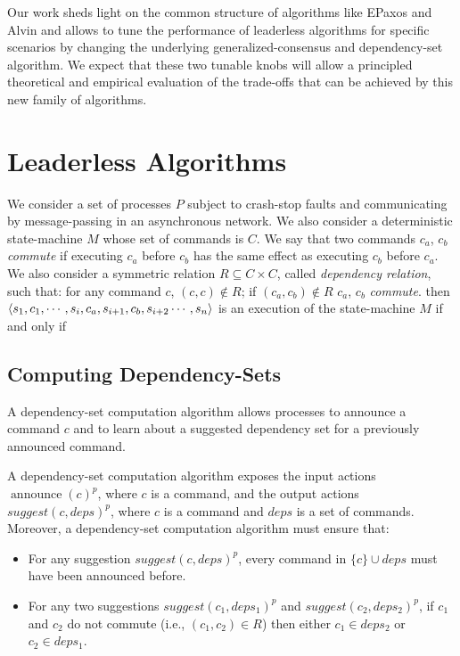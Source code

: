 Our work sheds light on the common structure of algorithms like EPaxos and Alvin and allows to tune the performance of leaderless algorithms for specific scenarios by changing the underlying generalized-consensus and dependency-set algorithm. 
We expect that these two tunable knobs will allow a principled theoretical and empirical evaluation of the trade-offs that can be achieved by this new family of algorithms.

\section{Leaderless Algorithms}

We consider a set of processes $P$ subject to crash-stop faults and communicating by message-passing in an asynchronous network.
We also consider a deterministic state-machine $M$ whose set of commands is $C$. We say that two commands $c_a$, $c_b$ \textit{commute} if executing $c_a$ before $c_b$ has the same effect as executing $c_b$ before $c_a$. We also consider a symmetric relation $R \subseteq C\times C$, called \textit{dependency relation}, such that: for any command $c$, $\left( c,c \right)\notin R$;  if $\left( c_a,c_b \right)\notin R$ $c_a$, $c_b$ \textit{commute}. then $\left\langle s_1,c_1,\cdots,s_i,c_a,s_{i+1},c_b,s_{i+2}\cdots,s_n\right\rangle$ is an execution of the state-machine $M$ if and only if

\subsection{Computing Dependency-Sets}

A dependency-set computation algorithm allows processes to announce a command $c$ and to learn about a suggested dependency set for a previously announced command.

A dependency-set computation algorithm exposes the input actions ${\operatorname{announce}\left( c \right)}^p$, where $c$ is a command, and the output actions ${suggest\left( c, deps \right)}^p$, where $c$ is a command and $deps$ is a set of commands.
Moreover, a dependency-set computation algorithm must ensure that:
\begin{itemize}[noitemsep,nolistsep]
    \item For any suggestion ${suggest\left( c, deps \right)}^p$, every command in $\{c\}\cup deps$ must have been announced before.
    \item For any two suggestions $suggest\left( c_1, deps_1 \right)^p$ and $suggest\left( c_2, deps_2 \right)^p$,  if $c_1$ and $c_2$ do not commute (i.e., $\left( c_1,c_2 \right) \in R$) then either $c_1\in deps_2$ or $c_2 \in deps_1$.
\end{itemize}

